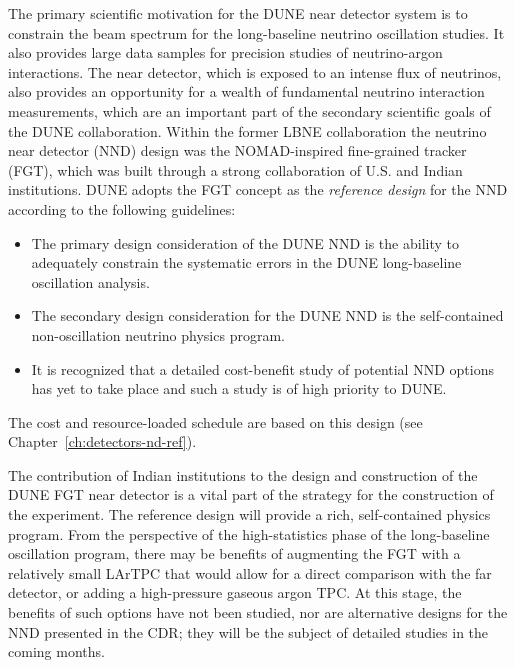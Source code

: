 The
primary scientific motivation for the DUNE near detector system is to
constrain the beam spectrum for the long-baseline neutrino oscillation
studies. It also provides large data samples for precision studies of
neutrino-argon interactions. The near detector, which is exposed to an
intense flux of neutrinos, also provides an opportunity for a wealth
of fundamental neutrino interaction measurements, which are an
important part of the secondary scientific goals of the DUNE
collaboration. 
Within the former LBNE collaboration the neutrino near
detector (NND) design was the NOMAD-inspired fine-grained tracker
(FGT), which was built through a strong collaboration of U.S. and
Indian institutions. DUNE adopts the FGT concept as the 
\textit{reference design} for the NND according to the following guidelines:
\begin{itemize}
\item The primary design consideration of the DUNE NND
is the ability to adequately constrain the systematic
  errors in the DUNE long-baseline oscillation analysis.
\item The secondary design consideration for the DUNE NND is the
  self-contained non-oscillation neutrino physics program.
\item It is recognized that a detailed cost-benefit study of potential
  NND options has yet to take place and such a study is of high
  priority to DUNE. 
\end{itemize}
The cost and resource-loaded schedule are based on this design (see
Chapter~\ref{ch:detectors-nd-ref}).

The contribution of Indian institutions to the design and construction
of the DUNE FGT near detector is a vital part of the strategy for the
construction of the experiment. The reference design will provide a
rich, self-contained physics program. From the perspective of the
high-statistics phase of the long-baseline oscillation program, there
may be benefits of augmenting the FGT with a relatively small LArTPC
that would allow for a direct comparison with the far detector, or
adding a high-pressure gaseous argon TPC. At this stage, the benefits
of such options have not been studied, nor are alternative designs for
the NND presented in the CDR; they will be the subject of detailed
studies in the coming months.

